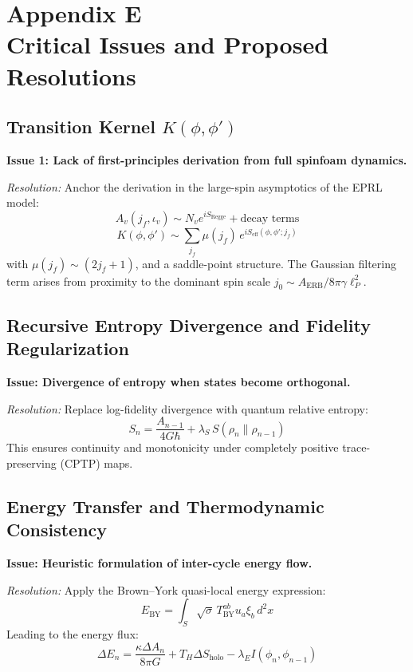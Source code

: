 \section*{Appendix E\\Critical Issues and Proposed Resolutions}
\label{appendix:E}

\subsection*{Transition Kernel $K(\phi, \phi')$}

\textbf{Issue 1: Lack of first-principles derivation from full spinfoam dynamics.}

\textit{Resolution:}  
Anchor the derivation in the large-spin asymptotics of the EPRL model:
\[
A_v(j_f, \iota_v) \sim N_v e^{i S_{\text{Regge}}} + \text{decay terms}
\]
\[
K(\phi, \phi') \sim \sum_{j_f} \mu(j_f) \, e^{i S_{\text{eff}}(\phi, \phi'; j_f)}
\]
with \( \mu(j_f) \sim (2j_f+1) \), and a saddle-point structure. The Gaussian filtering term arises from proximity to the dominant spin scale \( j_0 \sim A_{\text{ERB}} / 8\pi\gamma\ell_P^2 \).

\subsection*{Recursive Entropy Divergence and Fidelity Regularization}

\textbf{Issue: Divergence of entropy when states become orthogonal.}

\textit{Resolution:}  
Replace log-fidelity divergence with quantum relative entropy:
\[
S_n = \frac{A_{n-1}}{4G\hbar} + \lambda_S \, S(\rho_n \| \rho_{n-1})
\]
This ensures continuity and monotonicity under completely positive trace-preserving (CPTP) maps.

\subsection*{Energy Transfer and Thermodynamic Consistency}

\textbf{Issue: Heuristic formulation of inter-cycle energy flow.}

\textit{Resolution:}  
Apply the Brown–York quasi-local energy expression:
\[
E_{\text{BY}} = \int_S \sqrt{\sigma} \, T^{ab}_{\text{BY}} u_a \xi_b \, d^2x
\]
Leading to the energy flux:
\[
\Delta E_n = \frac{\kappa \Delta A_n}{8\pi G} + T_H \Delta S_{\text{holo}} - \lambda_E I(\phi_n, \phi_{n-1})
\]

